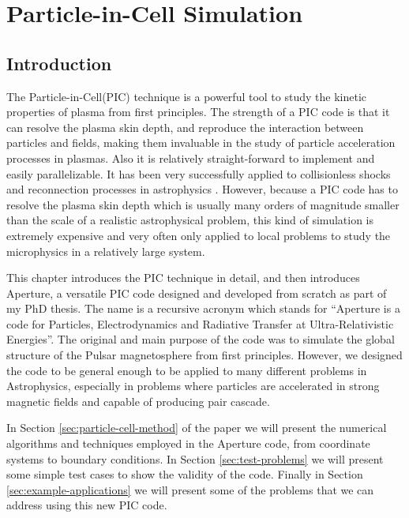 
\chapter{Particle-in-Cell Simulation}
\label{chap:pic}

\section{Introduction}
\label{sec:introduction}

The Particle-in-Cell(PIC) technique is a powerful tool to study the kinetic
properties of plasma from first principles. The strength of a PIC code is that
it can resolve the plasma skin depth, and reproduce the interaction between
particles and fields, making them invaluable in the study of particle
acceleration processes in plasmas. Also it is relatively straight-forward to
implement and easily parallelizable. It has been very successfully applied to
collisionless shocks and reconnection processes in astrophysics
. However, because a PIC code has to resolve the
plasma skin depth which is usually many orders of magnitude smaller than the
scale of a realistic astrophysical problem, this kind of simulation is extremely
expensive and very often only applied to local problems to study the
microphysics in a relatively large system.

This chapter introduces the PIC technique in detail, and then introduces
Aperture, a versatile PIC code designed and developed from scratch as part of my
PhD thesis. The name is a recursive acronym which stands for ``Aperture is a code
for Particles, Electrodynamics and Radiative Transfer at Ultra-Relativistic
Energies''. The original and main purpose of the code was to simulate the global
structure of the Pulsar magnetosphere from first principles. However, we
designed the code to be general enough to be applied to many different problems
in Astrophysics, especially in problems where particles are accelerated in
strong magnetic fields and capable of producing pair cascade.

In Section \ref{sec:particle-cell-method} of the paper we will present
the numerical algorithms and techniques employed in the Aperture code,
from coordinate systems to boundary conditions. In Section
\ref{sec:test-problems} we will present some simple test cases to show
the validity of the code. Finally in Section
\ref{sec:example-applications} we will present some of the problems
that we can address using this new PIC code.

